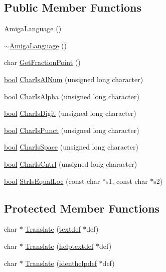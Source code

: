 \subsection*{Public Member Functions}
\begin{DoxyCompactItemize}
\item 
\hyperlink{classAmigaLanguage_a5c5ba90b1a15f4b2ab7e4c0bdd7ca10d}{Amiga\+Language} ()
\item 
\hyperlink{classAmigaLanguage_a76e791f9eed9a9703c0a7fb7db68b09c}{$\sim$\+Amiga\+Language} ()
\item 
char \hyperlink{classAmigaLanguage_a8a3e470096d156b2c6e42283b5110b02}{Get\+Fraction\+Point} ()
\item 
\hyperlink{platform_8h_a1062901a7428fdd9c7f180f5e01ea056}{bool} \hyperlink{classAmigaLanguage_ae54fcf4c689939e1e0285781d47cf3b0}{Char\+Is\+Al\+Num} (unsigned long character)
\item 
\hyperlink{platform_8h_a1062901a7428fdd9c7f180f5e01ea056}{bool} \hyperlink{classAmigaLanguage_a3e786ae72c994e3d78eb19a5d8e896fc}{Char\+Is\+Alpha} (unsigned long character)
\item 
\hyperlink{platform_8h_a1062901a7428fdd9c7f180f5e01ea056}{bool} \hyperlink{classAmigaLanguage_afe6f40c3f96590d22a3fc6865058cc5c}{Char\+Is\+Digit} (unsigned long character)
\item 
\hyperlink{platform_8h_a1062901a7428fdd9c7f180f5e01ea056}{bool} \hyperlink{classAmigaLanguage_a915f8711f21b74ef2f9ad70f88cfdffb}{Char\+Is\+Punct} (unsigned long character)
\item 
\hyperlink{platform_8h_a1062901a7428fdd9c7f180f5e01ea056}{bool} \hyperlink{classAmigaLanguage_a41efaa7468f213abcaadda4dc4b73c9d}{Char\+Is\+Space} (unsigned long character)
\item 
\hyperlink{platform_8h_a1062901a7428fdd9c7f180f5e01ea056}{bool} \hyperlink{classAmigaLanguage_a2ae24f616652a4fc8af365d0ee50ae76}{Char\+Is\+Cntrl} (unsigned long character)
\item 
\hyperlink{platform_8h_a1062901a7428fdd9c7f180f5e01ea056}{bool} \hyperlink{classAmigaLanguage_a19a04fb8a564dd9fbeaf6f5b822d38e6}{Str\+Is\+Equal\+Loc} (const char $\ast$s1, const char $\ast$s2)
\end{DoxyCompactItemize}
\subsection*{Protected Member Functions}
\begin{DoxyCompactItemize}
\item 
char $\ast$ \hyperlink{classAmigaLanguage_accf773d855875f669a9be99ef807ea0e}{Translate} (\hyperlink{structtextdef}{textdef} $\ast$def)
\item 
char $\ast$ \hyperlink{classAmigaLanguage_a7ee105ba4936bb1782f5a367e920c2a7}{Translate} (\hyperlink{structhelptextdef}{helptextdef} $\ast$def)
\item 
char $\ast$ \hyperlink{classAmigaLanguage_ab77fb07aebba5056bd84d6d8e0bf5a5b}{Translate} (\hyperlink{structidenthelpdef}{identhelpdef} $\ast$def)
\end{DoxyCompactItemize}
